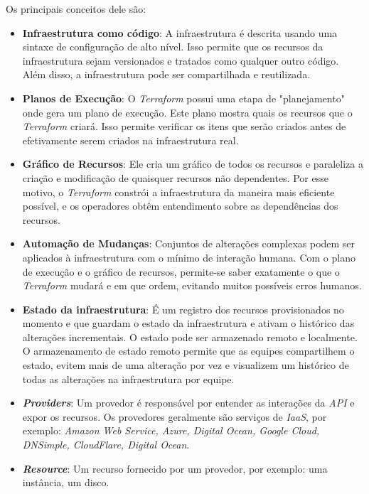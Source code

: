 Os principais conceitos dele são:
 \begin{itemize}
\item \textbf{Infraestrutura como código}: A infraestrutura é descrita usando uma sintaxe de configuração de alto nível. Isso permite que os recursos da infraestrutura sejam versionados e tratados como qualquer outro código. Além disso, a infraestrutura pode ser compartilhada e reutilizada.

\item \textbf{Planos de Execução}: O \textit{Terraform} possui uma etapa de "planejamento" onde gera um plano de execução. Este  plano mostra quais os recursos que o \textit{Terraform} criará. Isso permite verificar os itens que serão criados antes de efetivamente serem criados na infraestrutura real.

\item \textbf{Gráfico de Recursos}: Ele cria um gráfico de todos os recursos e paraleliza a criação e modificação de quaisquer recursos não dependentes. Por esse motivo, o \textit{Terraform} constrói a infraestrutura da maneira mais eficiente possível, e os operadores obtêm entendimento sobre as dependências dos recursos.

\item \textbf{Automação de Mudanças}: Conjuntos de alterações complexas podem ser aplicados à infraestrutura com o mínimo de interação humana. Com o plano de execução e o gráfico de recursos, permite-se saber exatamente o que o \textit{Terraform} mudará e em que ordem, evitando muitos possíveis erros humanos.

\item \textbf{Estado da infraestrutura}: É um registro dos recursos provisionados no momento e que guardam o estado da infraestrutura e ativam o histórico das alterações incrementais. O estado pode ser armazenado remoto e localmente. O armazenamento de estado remoto permite que as equipes compartilhem o estado, evitem mais de uma alteração por vez e visualizem um histórico de todas as alterações na infraestrutura por equipe.

\item \textbf{\textit{Providers}}: Um provedor é responsável por entender as interações da \textit{API} e expor os recursos. Os provedores geralmente são serviços de \textit{IaaS},  por exemplo: \textit{Amazon
Web Service, Azure, Digital Ocean, Google Cloud, DNSimple, CloudFlare, Digital Ocean}.

\item \textbf{\textit{Resource}}: Um recurso fornecido por um provedor, por exemplo: uma instância, um disco.   


\end{itemize}
